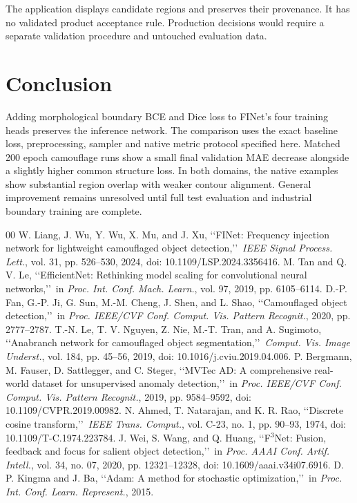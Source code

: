 \documentclass[conference,letterpaper]{IEEEtran}
\begin{document}
The application displays candidate regions and preserves their provenance. It has no validated product acceptance rule. Production decisions would require a separate validation procedure and untouched evaluation data.

\newpage
\section{Conclusion}
Adding morphological boundary BCE and Dice loss to FINet's four training heads preserves the inference network. The comparison uses the exact baseline loss, preprocessing, sampler and native metric protocol specified here. Matched 200 epoch camouflage runs show a small final validation MAE decrease alongside a slightly higher common structure loss. In both domains, the native examples show substantial region overlap with weaker contour alignment. General improvement remains unresolved until full test evaluation and industrial boundary training are complete.

\begin{thebibliography}{00}
W. Liang, J. Wu, Y. Wu, X. Mu, and J. Xu, \lq\lq FINet: Frequency injection network for lightweight camouflaged object detection,\rq\rq\ \textit{IEEE Signal Process. Lett.}, vol. 31, pp. 526--530, 2024, doi: 10.1109/LSP.2024.3356416.
M. Tan and Q. V. Le, \lq\lq EfficientNet: Rethinking model scaling for convolutional neural networks,\rq\rq\ in \textit{Proc. Int. Conf. Mach. Learn.}, vol. 97, 2019, pp. 6105--6114.
D.-P. Fan, G.-P. Ji, G. Sun, M.-M. Cheng, J. Shen, and L. Shao, \lq\lq Camouflaged object detection,\rq\rq\ in \textit{Proc. IEEE/CVF Conf. Comput. Vis. Pattern Recognit.}, 2020, pp. 2777--2787.
T.-N. Le, T. V. Nguyen, Z. Nie, M.-T. Tran, and A. Sugimoto, \lq\lq Anabranch network for camouflaged object segmentation,\rq\rq\ \textit{Comput. Vis. Image Underst.}, vol. 184, pp. 45--56, 2019, doi: 10.1016/j.cviu.2019.04.006.
P. Bergmann, M. Fauser, D. Sattlegger, and C. Steger, \lq\lq MVTec AD: A comprehensive real-world dataset for unsupervised anomaly detection,\rq\rq\ in \textit{Proc. IEEE/CVF Conf. Comput. Vis. Pattern Recognit.}, 2019, pp. 9584--9592, doi: 10.1109/CVPR.2019.00982.
N. Ahmed, T. Natarajan, and K. R. Rao, \lq\lq Discrete cosine transform,\rq\rq\ \textit{IEEE Trans. Comput.}, vol. C-23, no. 1, pp. 90--93, 1974, doi: 10.1109/T-C.1974.223784.
J. Wei, S. Wang, and Q. Huang, \lq\lq F$^3$Net: Fusion, feedback and focus for salient object detection,\rq\rq\ in \textit{Proc. AAAI Conf. Artif. Intell.}, vol. 34, no. 07, 2020, pp. 12321--12328, doi: 10.1609/aaai.v34i07.6916.
D. P. Kingma and J. Ba, \lq\lq Adam: A method for stochastic optimization,\rq\rq\ in \textit{Proc. Int. Conf. Learn. Represent.}, 2015.
\end{thebibliography}
\end{document}

